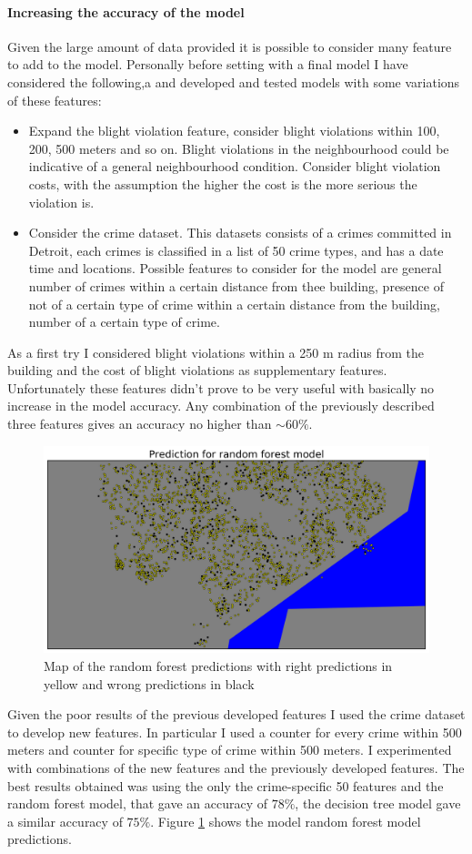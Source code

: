 \documentclass[a4paper,12pt]{article}
\begin{document}
\paragraph{Increasing the accuracy of the model}
Given the large amount of data provided it is possible to consider many feature to add to the model. Personally before setting with a final model I have considered the following,a and developed and tested models with some variations of these features:
\begin{itemize}
\item Expand the blight violation feature, consider blight violations within 100, 200, 500 meters and so on. Blight violations in the neighbourhood could be indicative of a general neighbourhood condition. Consider blight violation costs, with the assumption the higher the cost is the more serious the violation is.
\item Consider the crime dataset. This datasets consists of a crimes committed in Detroit, each crimes is classified in a list of 50 crime types, and has a date time and locations. Possible features to consider for the model are general number of crimes within a certain distance from thee building, presence of not of a certain type of crime within a certain distance from the building, number of a certain type of crime. 
\end{itemize}
As a first try I considered blight violations within a 250 m radius from the building and the cost of blight violations as supplementary features. Unfortunately these features didn't prove to be very useful with basically no increase in the model accuracy. Any combination of the previously  described three features gives an accuracy no higher than $\sim 60 \%$.
\begin{figure}
\includegraphics[scale=0.55]{predict.png}
\caption{Map of the random forest predictions with right predictions in yellow and wrong predictions in black}
\label{pred}
\end{figure}
Given the poor results of the previous developed features I used the crime dataset to develop new features. In particular I used a counter for every crime within 500 meters and counter for specific type of crime within 500 meters. I experimented with combinations of the new features and the previously developed features. The best results obtained was using the only the crime-specific 50 features and the random forest model, that gave an accuracy of $78\%$, the decision tree model gave a similar accuracy of $75\%$. Figure \ref{pred} shows the model random forest model predictions.
\end{document}
